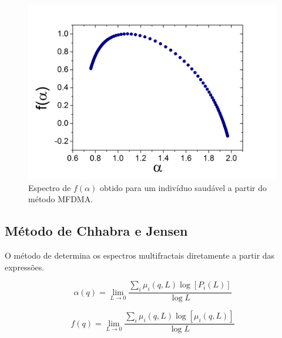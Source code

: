 \documentclass{ufscThesis}
\begin{document}
\begin{figure}[!h]
\centering
\includegraphics[scale=0.3]{spectr_saudavel_mfdma.png}
\caption{Espectro de $f(\alpha)$ obtido para um indivíduo saudável a partir do método MFDMA.}
\label{mfdmasaud}
\end{figure}

\subsection{Método de Chhabra e Jensen}

O método de  determina os espectros multifractais diretamente a partir das expressões. \par

\begin{equation}
\alpha(q) = \lim_{L\rightarrow 0} \frac{\sum_{i} \mu_{i} (q,L) \log {[P_{i}(L)]}}{\log L}
\end{equation}

\begin{equation}
f(q) = \lim_{L\rightarrow 0} \frac{\sum_{i} \mu_{i} (q,L) \log {[\mu_{i}(q,L)]}}{\log L }
\end{equation}
\end{document}
